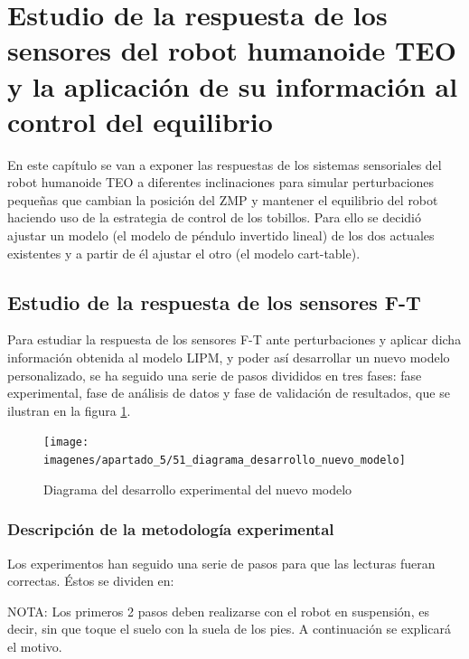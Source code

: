 \section{Estudio de la respuesta de los sensores del robot humanoide TEO y la aplicación de su información al control del equilibrio}

En este capítulo se van a exponer las respuestas de los sistemas sensoriales del robot humanoide TEO a diferentes inclinaciones  para simular perturbaciones pequeñas que cambian la posición del ZMP y mantener el equilibrio del robot haciendo uso de la estrategia de control de los tobillos. Para ello se decidió ajustar un modelo (el modelo de péndulo invertido lineal) de los dos actuales existentes y a partir de él ajustar el otro (el modelo cart-table).

\subsection{Estudio de la respuesta de los sensores F-T}

Para estudiar la respuesta de los sensores F-T ante perturbaciones y aplicar dicha información obtenida al modelo LIPM, y poder así desarrollar un nuevo modelo personalizado, se ha seguido una serie de pasos divididos en tres fases: fase experimental, fase de análisis de datos y fase de validación de resultados, que se ilustran en la figura \ref{figura51}. 

\begin{figure}[H]
\centering
\texttt{[image: imagenes/apartado\_5/51\_diagrama\_desarrollo\_nuevo\_modelo]}
\caption{Diagrama del desarrollo experimental del nuevo modelo}
\label{figura51}
\end{figure}

\subsubsection{Descripción de la metodología experimental}

Los experimentos han seguido una serie de pasos para que las lecturas fueran correctas. Éstos se dividen en:

NOTA: Los primeros 2 pasos deben realizarse con el robot en suspensión, es decir, sin que toque el suelo con la suela de los pies. A continuación se explicará el motivo.

